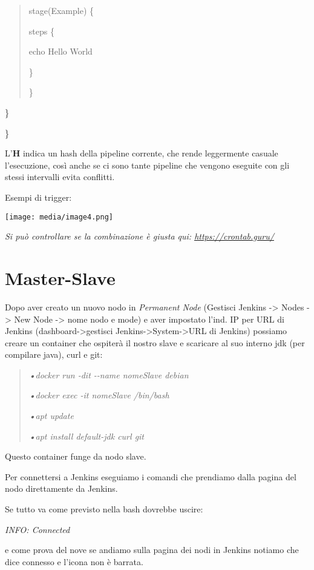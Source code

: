 \begin{quote}
stage(\textquotesingle Example\textquotesingle) \{

steps \{

echo \textquotesingle Hello World\textquotesingle{}

\}

\}
\end{quote}

\}

\}

L'\textbf{H} indica un hash della pipeline corrente, che rende
leggermente casuale l'esecuzione, così anche se ci sono tante pipeline
che vengono eseguite con gli stessi intervalli evita conflitti.

Esempi di trigger:

\texttt{[image: media/image4.png]}

\emph{Si può controllare se la combinazione è giusta qui:
\href{https://crontab.guru/}{\ul{https://crontab.guru/}}}

\section{Master-Slave}\label{master-slave}

Dopo aver creato un nuovo nodo in \emph{Permanent Node} (Gestisci
Jenkins -\textgreater{} Nodes -\textgreater{} New Node -\textgreater{}
nome nodo e mode) e aver impostato l'ind. IP per URL di Jenkins
(dashboard-\textgreater gestisci
Jenkins-\textgreater System-\textgreater URL di Jenkins) possiamo creare
un container che ospiterà il nostro slave e scaricare al suo interno jdk
(per compilare java), curl e git:

\begin{quote}
\emph{•docker run -dit -\/-name nomeSlave debian}

\emph{•docker exec -it nomeSlave /bin/bash}

\emph{•apt update}

\emph{•apt install default-jdk curl git}
\end{quote}

Questo container funge da nodo slave.

Per connettersi a Jenkins eseguiamo i comandi che prendiamo dalla pagina
del nodo direttamente da Jenkins.

Se tutto va come previsto nella bash dovrebbe uscire:

\emph{INFO: Connected}

e come prova del nove se andiamo sulla pagina dei nodi in Jenkins
notiamo che dice connesso e l'icona non è barrata.


